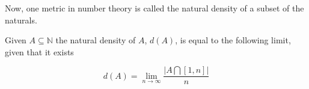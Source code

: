 \documentclass[paper=a4,fontsize=paper,12.5pt]{book}
\newcommand{\3}{\vspace*{3mm}}
\newcommand{\N}{\mathbb{N}}
\begin{document}
Now, one metric in number theory is called the natural density of a subset of the naturals.

\begin{definition}

Given $A \subseteq \N$ the natural density of $A$, $d(A)$, is equal to the following limit, given that it exists 

\[d(A) =  \lim_{n \to \infty} \frac{\vert A \bigcap [1,n] \vert}{n} \]

\end{definition}
\end{document}

